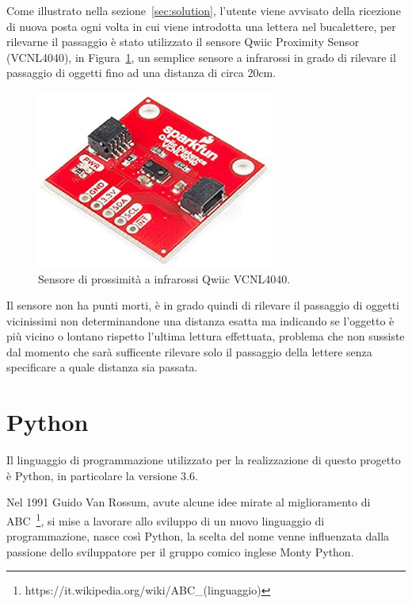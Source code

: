 Come illustrato nella sezione~\ref{sec:solution}, l'utente viene avvisato della ricezione di nuova posta ogni volta in cui viene introdotta una lettera nel bucalettere,
per rilevarne il passaggio è stato utilizzato il sensore Qwiic Proximity Sensor (VCNL4040), in Figura~\ref{photo_sensor}, un semplice sensore a infrarossi in grado di 
rilevare il passaggio di oggetti fino ad una distanza di circa 20cm.
\begin{figure}[htb]
    \centering
    \includegraphics[width=0.7\textwidth]{images/sensor.png}
    \caption{Sensore di prossimità a infrarossi Qwiic VCNL4040.}
    \label{photo_sensor}
\end{figure}

Il sensore non ha punti morti, è in grado quindi di rilevare il passaggio di oggetti vicinissimi non determinandone una distanza esatta ma indicando se l'oggetto è più 
vicino o lontano rispetto l'ultima lettura effettuata, problema che non sussiste dal momento che sarà sufficente rilevare solo il passaggio 
della lettere senza specificare a quale distanza sia passata.



\section{Python}
\label{sec:python}
Il linguaggio di programmazione utilizzato per la realizzazione di questo progetto è Python, in particolare la versione 3.6.

Nel 1991 Guido Van Rossum, avute alcune idee mirate al miglioramento di ABC~\footnote{https://it.wikipedia.org/wiki/ABC\_(linguaggio)}, si mise a lavorare allo 
sviluppo di un nuovo linguaggio di programmazione, nasce così Python, la scelta del nome venne influenzata dalla passione dello sviluppatore per il gruppo comico 
inglese Monty Python.

